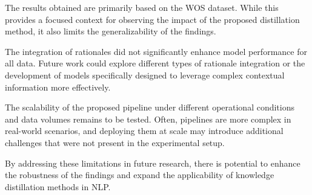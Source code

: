 The results obtained are primarily based on the WOS dataset. While this provides a focused context for observing the impact of the proposed distillation method, it also limits the generalizability of the findings.

The integration of rationales did not significantly enhance model performance for all data. Future work could explore different types of rationale integration or the development of models specifically designed to leverage complex contextual information more effectively.

The scalability of the proposed pipeline under different operational conditions and data volumes remains to be tested. Often, pipelines are more complex in real-world scenarios, and deploying them at scale may introduce additional challenges that were not present in the experimental setup.

By addressing these limitations in future research, there is potential to enhance the robustness of the findings and expand the applicability of knowledge distillation methods in NLP.

